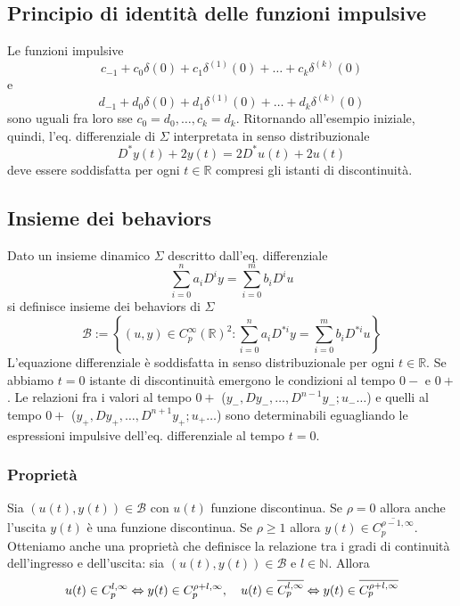 \documentclass[11pt]{article}
\begin{document}
\subsection{Principio di identità delle funzioni impulsive}
Le funzioni impulsive 
\begin{displaymath}
    c_{-1} + c_0 \delta(0) + c_1 \delta^{(1)}(0)+\dots+c_k\delta^{(k)}(0)
\end{displaymath}
e
\begin{displaymath}
    d_{-1} + d_0\delta(0)+d_1\delta^{(1)}(0)+\dots+d_k\delta^{(k)}(0)
\end{displaymath}
sono uguali fra loro sse $c_0=d_0,\dots,c_k=d_k$.
Ritornando all'esempio iniziale, quindi, l'eq. differenziale di $\Sigma$ interpretata in senso distribuzionale
\begin{displaymath}
    D^* y(t) + 2y(t) = 2D^* u(t) + 2u(t)
\end{displaymath}
deve essere soddisfatta per ogni $t \in \mathbb{R}$ compresi gli istanti di discontinuità.
\subsection{Insieme dei behaviors}
Dato un insieme dinamico $\Sigma$ descritto dall'eq. differenziale 
\begin{displaymath}
    \sum_{i=0}^n a_i D^i y = \sum_{i=0}^m b_i D^i u
\end{displaymath}
si definisce insieme dei behaviors di $\Sigma$
\begin{displaymath}
    \mathcal{B}:= \left\{(u,y)\in C_p^\infty (\mathbb{R})^2: \sum_{i=0}^n a_i D^{*i} y = \sum_{i=0}^m b_i D^{*i}u\right\}
\end{displaymath}
L'equazione differenziale è soddisfatta in senso distribuzionale per ogni $t \in \mathbb{R}$. Se abbiamo $t=0$ istante di discontinuità emergono le condizioni al tempo $0-$ e $0+$. Le relazioni fra i valori al tempo $0+$ ($y_-, Dy_-,\dots,D^{n-1}y_-; u_-\dots$) e quelli al tempo $0+$ ($y_+, Dy_+,\dots,D^{n+1}y_+; u_+\dots$) sono determinabili eguagliando le espressioni impulsive dell'eq. differenziale al tempo $t=0$.
\subsubsection{Proprietà}
Sia $\left(u(t),y(t)\right) \in \mathcal{B}$ con $u(t)$ funzione discontinua. Se $\rho=0$ allora anche l'uscita $y(t)$ è una funzione discontinua. Se $\rho\ge1$ allora $y(t) \in \overline{C_p^{\rho-1,\infty}}$.\\
Otteniamo anche una proprietà che definisce la relazione tra i gradi di continuità dell'ingresso e dell'uscita: sia $\left(u(t),y(t)\right) \in \mathcal{B}$ e $l \in \mathbb{N}$. Allora
\begin{displaymath}
    u(t)\in C_p^{l,\infty} \Leftrightarrow y(t)\in C_p^{\rho+l,\infty}, \hspace{10px}u(t)\in \overline{C_p^{l,\infty} }\Leftrightarrow y(t)\in \overline{C_p^{\rho+l,\infty}}
\end{displaymath}
\end{document}
